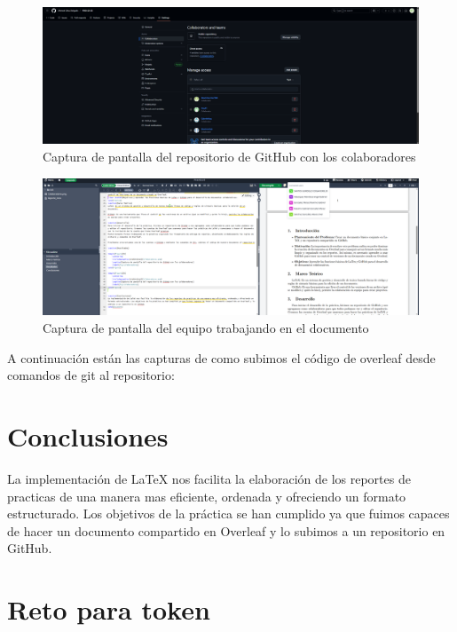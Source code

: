 \documentclass[letterpaper,12pt]{article}
\begin{document}
\begin{figure}[H]
    \centering
    \includegraphics[width=14cm]{Colaboradores.png}
    \caption{Captura de pantalla del repositorio de GitHub con los colaboradores}
    \label{fig:colaboradores}
\end{figure}


\begin{figure}[H]
    \centering
    \includegraphics[width=14cm]{Edicion.png}
    \caption{Captura de pantalla del equipo trabajando en el documento}
    \label{fig:colaboradores}
\end{figure}

A continuación están las capturas de como subimos el código de overleaf desde comandos de git al repositorio:

\section{Conclusiones}
La implementación de LaTeX nos facilita la elaboración de los reportes de practicas de una manera mas eficiente, ordenada y ofreciendo un formato estructurado. Los objetivos de la práctica se han cumplido ya que fuimos capaces de hacer un documento compartido en Overleaf y lo subimos a un repositorio en GitHub.

\section{Reto para token}
\end{document}
